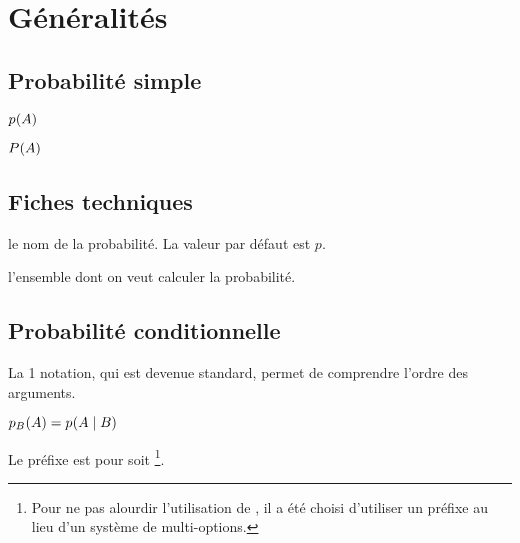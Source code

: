 \documentclass[12pt,a4paper]{article}
\begin{document}
\section{Généralités}

\subsection{Probabilité \og simple \fg}

\newparaexample{}

\begin{latexex}
$\proba{A}$
\end{latexex}





\begin{latexex}
$\proba[P]{A}$
\end{latexex}




\subsection{Fiches techniques}


\IDoption{} le nom de la probabilité. La valeur par défaut est $p$.

\IDarg{} l'ensemble dont on veut calculer la probabilité.




\subsection{Probabilité conditionnelle}


La 1\iere{} notation, qui est devenue standard, permet de comprendre l'ordre des arguments.
\begin{latexex}
 $\probacond {B}{A}
= \probacond*{B}{A}$
\end{latexex}





Le préfixe  est pour  soit 
\footnote{
	Pour ne pas alourdir l'utilisation de , il a été choisi d'utiliser un préfixe au lieu d'un système de multi-options.
}.
\end{document}
